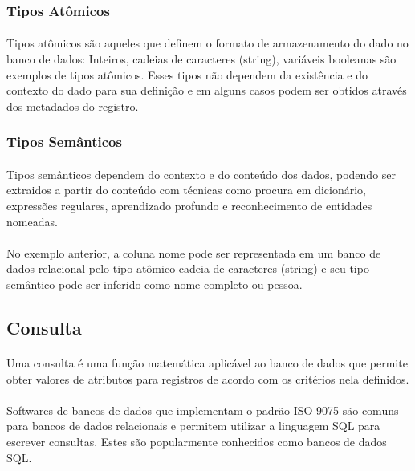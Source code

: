 \subsubsection{Tipos Atômicos}

\paragraph{} Tipos atômicos são aqueles que definem o formato de armazenamento do dado no banco de dados: Inteiros, cadeias de caracteres (string), variáveis booleanas são exemplos de tipos atômicos. Esses tipos não dependem da existência e do contexto do dado para sua definição e em alguns casos podem ser obtidos através dos metadados do registro.

\subsubsection{Tipos Semânticos}

\paragraph{} Tipos semânticos dependem do contexto e do conteúdo dos dados, podendo ser extraidos a partir do conteúdo com técnicas como procura em dicionário, expressões regulares, aprendizado profundo\cite{hulsebos2019sherlock} e reconhecimento de entidades nomeadas.

\paragraph{} No exemplo anterior, a coluna nome pode ser representada em um banco de dados relacional pelo tipo atômico cadeia de caracteres (string) e seu tipo semântico pode ser inferido como nome completo ou pessoa.


\subsection{Consulta}

\paragraph{} Uma consulta é uma função matemática aplicável ao banco de dados que permite obter valores de atributos para registros de acordo com os critérios nela definidos.

\paragraph{} Softwares de bancos de dados que implementam o padrão ISO 9075 são comuns para bancos de dados relacionais e permitem utilizar a linguagem SQL para escrever consultas. Estes são popularmente conhecidos como bancos de dados SQL.

